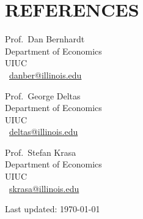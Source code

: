 \documentclass{article}
\begin{document}
\section{REFERENCES}
\begin{paracol}{3}

    \noindent Prof.\ Dan Bernhardt\\
    Department of Economics\\
    UIUC\\
    \Letter\ \href{mailto:danber@illinois.edu}{danber\textrm{@}illinois.edu}

\switchcolumn

    \noindent Prof.\ George Deltas\\
    Department of Economics\\
    UIUC\\
    \Letter\ \href{mailto:deltas@illinois.edu}{deltas\textrm{@}illinois.edu}

\switchcolumn

    \noindent Prof.\ Stefan Krasa\\
    Department of Economics\\
    UIUC\\
    \Letter\ \href{skrasa@illinois.edu}{skrasa\textrm{@}illinois.edu}

\end{paracol}

\vspace{5em}
\begin{center}   
	\begin{small}     
	  Last updated: \today 
	\end{small} 
\end{center}
\end{document}
